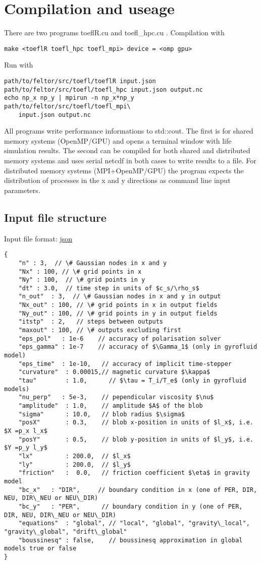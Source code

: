 \section{Compilation and useage}
There are two programs toeflR.cu and toefl\_hpc.cu . Compilation with
\begin{verbatim}
make <toeflR toefl_hpc toefl_mpi> device = <omp gpu>
\end{verbatim}
Run with
\begin{verbatim}
path/to/feltor/src/toefl/toeflR input.json
path/to/feltor/src/toefl/toefl_hpc input.json output.nc
echo np_x np_y | mpirun -n np_x*np_y path/to/feltor/src/toefl/toefl_mpi\
    input.json output.nc
\end{verbatim}
All programs write performance informations to std::cout.
The first is for shared memory systems (OpenMP/GPU) and opens a terminal window with life simulation results.
 The
second can be compiled for both shared and distributed memory systems and uses serial netcdf in both cases
to write results to a file.
For distributed
memory systems (MPI+OpenMP/GPU) the program expects the distribution of processes in the
x and y directions as command line input parameters.

\subsection{Input file structure}
Input file format: \href{https://en.wikipedia.org/wiki/JSON}{json}
\begin{verbatim}
{
    "n" : 3,  // \# Gaussian nodes in x and y
    "Nx" : 100, // \# grid points in x
    "Ny" : 100,  // \# grid points in y
    "dt" : 3.0,  // time step in units of $c_s/\rho_s$
    "n_out"  : 3,  // \# Gaussian nodes in x and y in output
    "Nx_out" : 100, // \# grid points in x in output fields
    "Ny_out" : 100, // \# grid points in y in output fields
    "itstp"  : 2,   // steps between outputs
    "maxout" : 100, // \# outputs excluding first
    "eps_pol"   : 1e-6    // accuracy of polarisation solver
    "eps_gamma" : 1e-7    // accuracy of $\Gamma_1$ (only in gyrofluid model)
    "eps_time"  : 1e-10,   // accuracy of implicit time-stepper
    "curvature"  : 0.00015,// magnetic curvature $\kappa$
    "tau"        : 1.0,      // $\tau = T_i/T_e$ (only in gyrofluid models)
    "nu_perp"   : 5e-3,    // pependicular viscosity $\nu$
    "amplitude"  : 1.0,    // amplitude $A$ of the blob
    "sigma"      : 10.0,   // blob radius $\sigma$
    "posX"       : 0.3,    // blob x-position in units of $l_x$, i.e. $X =p_x l_x$
    "posY"       : 0.5,    // blob y-position in units of $l_y$, i.e. $Y =p_y l_y$
    "lx"         : 200.0,  // $l_x$
    "ly"         : 200.0,  // $l_y$
    "friction"   :  0.0,   // friction coefficient $\eta$ in gravity model
    "bc_x"   : "DIR",     // boundary condition in x (one of PER, DIR, NEU, DIR\_NEU or NEU\_DIR)
    "bc_y"   : "PER",      // boundary condition in y (one of PER, DIR, NEU, DIR\_NEU or NEU\_DIR)
    "equations"  : "global", // "local", "global", "gravity\_local", "gravity\_global", "drift\_global"
    "boussinesq" : false,    // boussinesq approximation in global models true or false
}
\end{verbatim}

